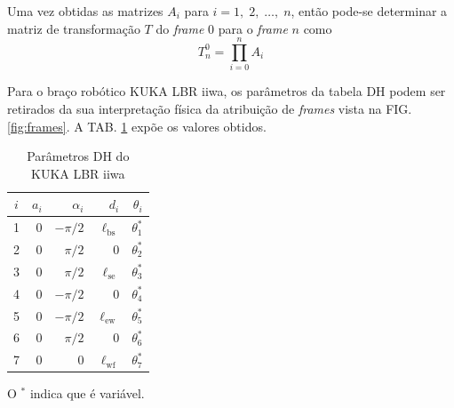 Uma vez obtidas as matrizes $A_i$ para $i= 1,\;2,\;\dots,\;n$, então pode-se determinar a matriz de transformação $T$ do \textit{frame} $0$ para o \textit{frame} $n$ como
\begin{equation*}
    T_n^0 = \prod_{i=0}^n A_i
\end{equation*}

Para o braço robótico KUKA LBR iiwa, os parâmetros da tabela DH podem ser retirados da sua interpretação física da atribuição de \textit{frames} vista na FIG. \ref{fig:frames}. A TAB. \ref{tab:DH} expõe os valores obtidos. 

\begin{table}[h]
    \centering
    \caption{Parâmetros DH do KUKA LBR iiwa}
    \label{tab:DH}
    \begin{tabular}{crrrr}
    \toprule
        $i$ & $a_i$ & $\alpha_i$ & $d_i$ & $\theta_i$ \\
    \midrule
        1 & 0 & $-\pi/2$ & $\ell_\mathrm{bs}$ & $\theta_1^*$ \\
        2 & 0 &  $\pi/2$ &                  0 & $\theta_2^*$ \\
        3 & 0 &  $\pi/2$ & $\ell_\mathrm{se}$ & $\theta_3^*$ \\
        4 & 0 & $-\pi/2$ &                  0 & $\theta_4^*$ \\
        5 & 0 & $-\pi/2$ & $\ell_\mathrm{ew}$ & $\theta_5^*$ \\
        6 & 0 &  $\pi/2$ &                  0 & $\theta_6^*$ \\
        7 & 0 &        0 & $\ell_\mathrm{wf}$ & $\theta_7^*$ \\
    \bottomrule
    \end{tabular}
    
O $^*$ indica que é variável.
\end{table}

